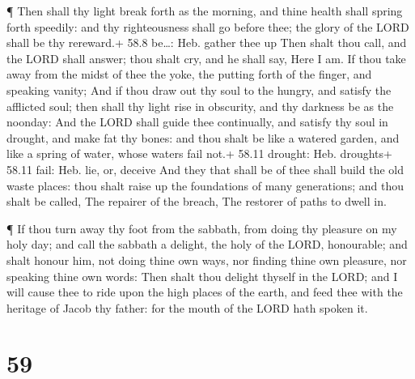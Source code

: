  ¶ Then shall thy light break forth as the morning, and
thine health shall spring forth speedily: and thy righteousness shall go
before thee; the glory of the LORD shall be thy rereward.+ 58.8
be\ldots: Heb. gather thee up  Then shalt thou call, and the
LORD shall answer; thou shalt cry, and he shall say, Here I am. If thou
take away from the midst of thee the yoke, the putting forth of the
finger, and speaking vanity;  And if thou draw out thy soul
to the hungry, and satisfy the afflicted soul; then shall thy light rise
in obscurity, and thy darkness be as the noonday:  And the
LORD shall guide thee continually, and satisfy thy soul in drought, and
make fat thy bones: and thou shalt be like a watered garden, and like a
spring of water, whose waters fail not.+ 58.11 drought: Heb. droughts+
58.11 fail: Heb. lie, or, deceive  And they that shall be
of thee shall build the old waste places: thou shalt raise up the
foundations of many generations; and thou shalt be called, The repairer
of the breach, The restorer of paths to dwell in.

 ¶ If thou turn away thy foot from the sabbath, from doing
thy pleasure on my holy day; and call the sabbath a delight, the holy of
the LORD, honourable; and shalt honour him, not doing thine own ways,
nor finding thine own pleasure, nor speaking thine own words:
 Then shalt thou delight thyself in the LORD; and I will
cause thee to ride upon the high places of the earth, and feed thee with
the heritage of Jacob thy father: for the mouth of the LORD hath spoken
it.

\hypertarget{section-58}{%
\section{59}\label{section-58}}

